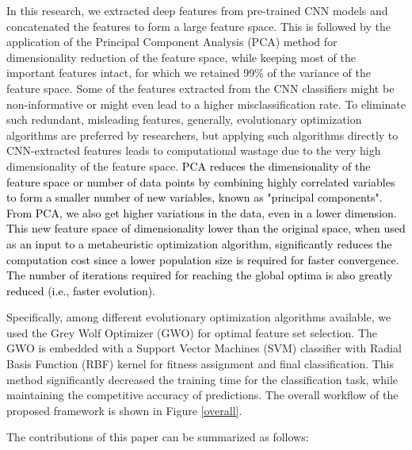 \documentclass{llncs}
\begin{document}
In this research, we extracted deep features \cite{azaza2021off,10.1007/978-981-16-1086-8_4} from pre-trained CNN models and concatenated the features to form a large feature space. This is followed by the application of the Principal Component Analysis (PCA) method for dimensionality reduction of the feature space, while keeping most of the important features intact, for which we retained 99\% of the variance of the feature space. Some of the features extracted from the CNN classifiers might be non-informative or might even lead to a higher misclassification rate. To eliminate such redundant, misleading features, generally, evolutionary optimization algorithms are preferred by researchers, but applying such algorithms directly to CNN-extracted features leads to computational wastage due to the very high dimensionality of the feature space. 
\textcolor{black}{PCA reduces the dimensionality of the feature space or number of data points by combining highly correlated variables to form a smaller number of new variables, known as "principal components". From PCA, we also get higher variations in the data, even in a lower dimension. This new feature space of dimensionality lower than the original space, when used as an input to a metaheuristic optimization algorithm, significantly reduces the computation cost since a lower population size is required for faster convergence. The number of iterations required for reaching the global optima is also greatly reduced (i.e., faster evolution).}

Specifically, among different evolutionary optimization algorithms available, we used the Grey Wolf Optimizer (GWO) \cite{mirjalili2014grey} for optimal feature set selection. The GWO is embedded with a Support Vector Machines (SVM) classifier \cite{zhang2012support} with Radial Basis Function (RBF) kernel for fitness assignment and final classification. This method significantly decreased the training time for the classification task, while maintaining the competitive accuracy of predictions. The overall workflow of the proposed framework is shown in Figure \ref{overall}.

The contributions of this paper can be summarized as follows:
\end{document}
